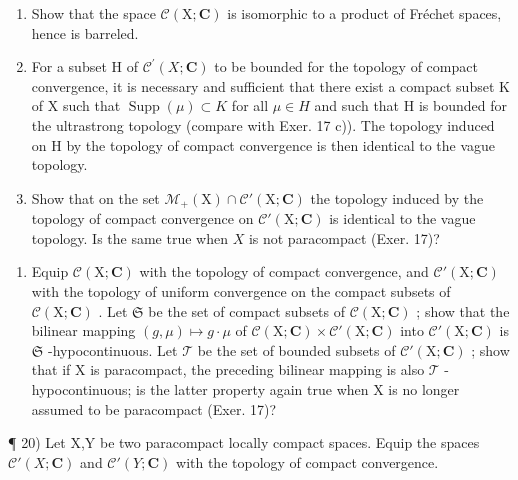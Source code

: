 \begin{enumerate}
\def\labelenumi{\alph{enumi})}
\item
  Show that the space \(\mathcal{C}(\mathrm{X};\mathbf{C})\) is isomorphic to a product of Fréchet spaces, hence is barreled.
\item
  For a subset H of \(\mathcal{C}^{\prime}(X; \mathbf{C})\) to be bounded for the topology of compact convergence, it is necessary and sufficient that there exist a compact subset K of X such that \(\operatorname{Supp}(\mu) \subset K\) for all \(\mu \in H\) and such that H is bounded for the ultrastrong topology (compare with Exer. 17 c)). The topology induced on H by the topology of compact convergence is then identical to the vague topology.
\item
  Show that on the set \(\mathcal{M}_{+}(\mathrm{X})\cap \mathcal{C}'(\mathrm{X};\mathbf{C})\) the topology induced by the topology of compact convergence on \(\mathcal{C}'(\mathrm{X};\mathbf{C})\) is identical to the vague topology. Is the same true when \(X\) is not paracompact (Exer. 17)?
\end{enumerate}

\begin{enumerate}
\def\labelenumi{\arabic{enumi})}
\setcounter{enumi}{18}
\tightlist
\item
  Equip \(\mathcal{C}(\mathrm{X};\mathbf{C})\) with the topology of compact convergence, and \(\mathcal{C}'(\mathrm{X};\mathbf{C})\) with the topology of uniform convergence on the compact subsets of \(\mathcal{C}(\mathrm{X};\mathbf{C})\) . Let \(\mathfrak{S}\) be the set of compact subsets of \(\mathcal{C}(\mathrm{X};\mathbf{C})\) ; show that the bilinear mapping \((g,\mu)\mapsto g\cdot \mu\) of \(\mathcal{C}(\mathrm{X};\mathbf{C})\times \mathcal{C}'(\mathrm{X};\mathbf{C})\) into \(\mathcal{C}'(\mathrm{X};\mathbf{C})\) is \(\mathfrak{S}\) -hypocontinuous. Let \(\mathcal{T}\) be the set of bounded subsets of \(\mathcal{C}'(\mathrm{X};\mathbf{C})\) ; show that if X is paracompact, the preceding bilinear mapping is also \(\mathcal{T}\) -hypocontinuous; is the latter property again true when X is no longer assumed to be paracompact (Exer. 17)?
\end{enumerate}

¶ 20) Let X,Y be two paracompact locally compact spaces. Equip the spaces \(\mathcal{C}'(X; \mathbf{C})\) and \(\mathcal{C}'(Y; \mathbf{C})\) with the topology of compact convergence.

